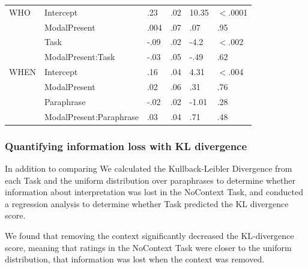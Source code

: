 \documentclass[12pt,letterpaper,table,svgnames,dvipsnames]{article}
\newcommand{\mm}[1]{\textcolor{teal}{[mm: #1]}}
\begin{document}
\begin{table}
\begin{center}
\begin{tabular}{l|lllll}
\bottomrule
\toprule
WHO & Intercept & .23 & .02 & 10.35 & $<$.0001\\
{} & ModalPresent & .004 & .07 & .07 & .95\\
{} & Task & -.09 & .02 & -4.2 & $<$.002\\
{} & ModalPresent:Task & -.03 & .05 & -.49 & .62\\
\bottomrule
\toprule
WHEN & Intercept & .16 & .04 & 4.31 & $<$.004\\
{} & ModalPresent & .02 & .06 & .31 & .76\\
{} & Paraphrase & -.02 & .02 & -1.01 & .28\\
{} & ModalPresent:Paraphrase & .03 & .04 & .71 & .48\\
\bottomrule
\end{tabular} 
\end{center} 
\end{table}






\subsubsection{Quantifying information loss with KL divergence}


In addition to comparing 
We calculated the Kullback-Leibler Divergence from each Task and the uniform distribution over paraphrases to determine whether information about interpretation was lost in the NoContext Task, and conducted a regression analysis to determine whether Task predicted the KL divergence score.

We found that removing the context significantly decreased the KL-divergence score, meaning that ratings in the NoContext Task were closer to the uniform distribution, that information was lost when the context was removed.

\end{document}
